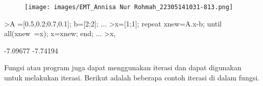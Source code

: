 \documentclass[a4paper,10pt]{article}
\begin{document}
\begin{eulernotebook}
\begin{figure}[h]
    \centering
    \texttt{[image: images/EMT\_Annisa Nur Rohmah\_22305141031-813.png]}
\end{figure}
\begin{eulerprompt}
>A =[0.5,0.2;0.7,0.1]; b=[2;2]; ...
>x=[1;1]; repeat xnew=A.x-b; until all(xnew~=x); x=xnew; end; ...
>x,
\end{eulerprompt}
\begin{euleroutput}
       -7.09677 
       -7.74194 
\end{euleroutput}
\begin{eulercomment}
Fungsi atau program juga dapat menggunakan iterasi dan dapat digunakan
untuk melakukan iterasi. Berikut adalah beberapa contoh iterasi di
dalam fungsi.


\end{eulercomment}
\end{eulernotebook}
\end{document}
